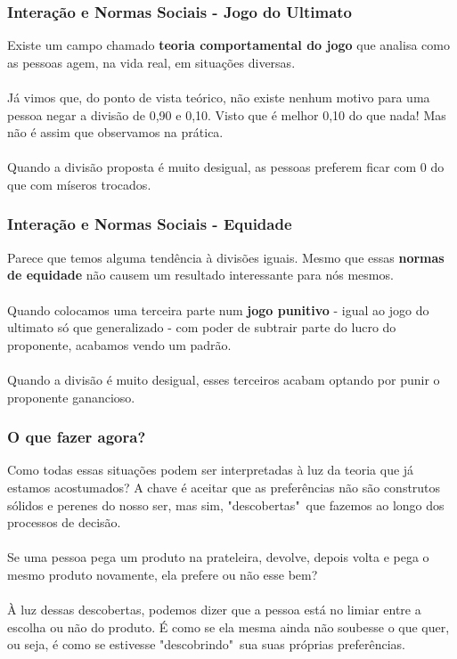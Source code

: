 \documentclass{beamer}[10]
\begin{document}
\begin{frame}
	\frametitle{Interação e Normas Sociais - Jogo do Ultimato}

	Existe um campo chamado \textbf{teoria comportamental do jogo} que analisa como as pessoas agem, na vida real, em situações diversas.
	\\~\\
	Já vimos que, do ponto de vista teórico, não existe nenhum motivo para uma pessoa negar a divisão de 0,90 e 0,10. Visto que é melhor 0,10 do que nada! Mas não é assim que observamos  na prática. 
	\\~\\
	Quando a divisão proposta é muito desigual, as pessoas preferem ficar com 0 do que com míseros trocados.

\end{frame}

\begin{frame}
	\frametitle{Interação e Normas Sociais - Equidade}

	Parece que temos alguma tendência à divisões iguais. Mesmo que essas \textbf{normas de equidade} não causem um resultado interessante para nós mesmos.
	\\~\\
	Quando colocamos uma terceira parte num \textbf{jogo punitivo} - igual ao jogo do ultimato só que generalizado - com poder de subtrair parte do lucro do proponente, acabamos vendo um padrão. 
	\\~\\
	Quando a divisão é muito desigual, esses terceiros acabam optando por punir o proponente ganancioso.

\end{frame}

\begin{frame}
	\frametitle{O que fazer agora?}

	Como todas essas situações podem ser interpretadas à luz da teoria que já estamos acostumados? A chave é aceitar que as preferências não são construtos sólidos e perenes do nosso ser, mas sim, "descobertas"\ que fazemos ao longo dos processos de decisão.
	\\~\\
	Se uma pessoa pega um produto na prateleira, devolve, depois volta e pega o mesmo produto novamente, ela prefere ou não esse bem? 
	\\~\\
	À luz dessas descobertas, podemos dizer que a pessoa está no limiar entre a escolha ou não do produto. É como se ela mesma ainda não soubesse o que quer, ou seja, é como se estivesse "descobrindo"\ sua suas próprias preferências.

\end{frame}
\end{document}
